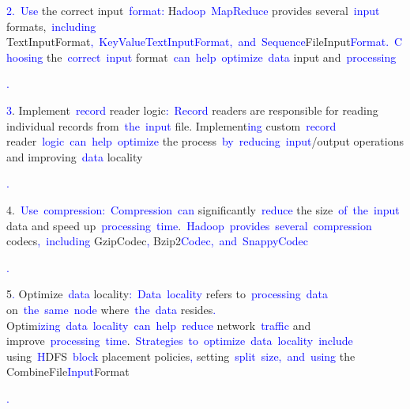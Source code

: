 \documentclass{article}
\begin{document}
\begin{tcolorbox}[colframe=black,colback=white]
{}\textcolor{blue}{2}\textcolor{blue}{.}\textcolor{blue}{~Use} the correct input\textcolor{blue}{~format}\textcolor{blue}{:} H\textcolor{blue}{adoop}\textcolor{blue}{~Map}\textcolor{blue}{Reduce} provides several\textcolor{blue}{~input} formats,\textcolor{blue}{~including} TextInputFormat\textcolor{blue}{,}\textcolor{blue}{~KeyValue}\textcolor{blue}{TextInput}\textcolor{blue}{Format}\textcolor{blue}{,}\textcolor{blue}{~and}\textcolor{blue}{~Sequence}FileInput\textcolor{blue}{Format}\textcolor{blue}{.}\textcolor{blue}{~Choosing} the\textcolor{blue}{~correct}\textcolor{blue}{~input} format\textcolor{blue}{~can}\textcolor{blue}{~help}\textcolor{blue}{~optimize}\textcolor{blue}{~data} input and\textcolor{blue}{~processing}\textcolor{blue}{.

}\textcolor{blue}{3}. Implement\textcolor{blue}{~record} reader logic\textcolor{blue}{:}\textcolor{blue}{~Record} readers are responsible for reading individual records from\textcolor{blue}{~the}\textcolor{blue}{~input} file. Implement\textcolor{blue}{ing} custom\textcolor{blue}{~record} reader\textcolor{blue}{~logic}\textcolor{blue}{~can}\textcolor{blue}{~help}\textcolor{blue}{~optimize} the process\textcolor{blue}{~by}\textcolor{blue}{~reducing}\textcolor{blue}{~input}/output operations and improving\textcolor{blue}{~data} locality\textcolor{blue}{.

}4.\textcolor{blue}{~Use}\textcolor{blue}{~compression}\textcolor{blue}{:}\textcolor{blue}{~Compression}\textcolor{blue}{~can} significantly\textcolor{blue}{~reduce} the size\textcolor{blue}{~of}\textcolor{blue}{~the}\textcolor{blue}{~input} data and speed up\textcolor{blue}{~processing}\textcolor{blue}{~time}.\textcolor{blue}{~H}\textcolor{blue}{adoop}\textcolor{blue}{~provides}\textcolor{blue}{~several}\textcolor{blue}{~compression} codecs\textcolor{blue}{,}\textcolor{blue}{~including} GzipCodec\textcolor{blue}{,} Bzip2\textcolor{blue}{Codec}\textcolor{blue}{,}\textcolor{blue}{~and}\textcolor{blue}{~Sn}\textcolor{blue}{appy}\textcolor{blue}{Codec}\textcolor{blue}{.

}5\textcolor{blue}{.} Optimize\textcolor{blue}{~data} locality\textcolor{blue}{:}\textcolor{blue}{~Data}\textcolor{blue}{~locality} refers to\textcolor{blue}{~processing}\textcolor{blue}{~data} on\textcolor{blue}{~the}\textcolor{blue}{~same}\textcolor{blue}{~node} where\textcolor{blue}{~the}\textcolor{blue}{~data} resides\textcolor{blue}{.} Optim\textcolor{blue}{izing}\textcolor{blue}{~data}\textcolor{blue}{~locality}\textcolor{blue}{~can}\textcolor{blue}{~help}\textcolor{blue}{~reduce} network\textcolor{blue}{~traffic} and improve\textcolor{blue}{~processing}\textcolor{blue}{~time}.\textcolor{blue}{~Strategies}\textcolor{blue}{~to}\textcolor{blue}{~optimize}\textcolor{blue}{~data}\textcolor{blue}{~locality}\textcolor{blue}{~include} using\textcolor{blue}{~H}DFS\textcolor{blue}{~block} placement policies\textcolor{blue}{,} setting\textcolor{blue}{~split}\textcolor{blue}{~size}\textcolor{blue}{,}\textcolor{blue}{~and}\textcolor{blue}{~using} the CombineFile\textcolor{blue}{Input}Format\textcolor{blue}{.

}
\end{tcolorbox}
\end{document}
